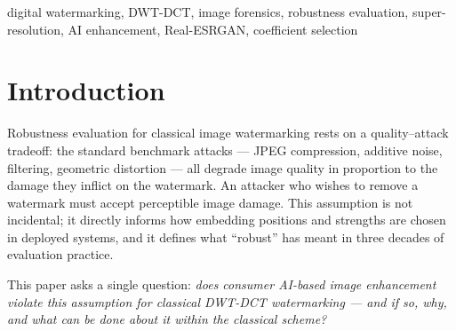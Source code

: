 \documentclass[conference]{IEEEtran}
\begin{document}
\begin{abstract}
removing 30--53\% of the embedded coefficient differential and moving
each block toward its natural coefficient ordering --- behavior
consistent with an \emph{endogenous restoration} process rather than
exogenous noise --- and 77--91\% of bit flips occur in blocks whose
natural ordering opposes the embedded bit. PSNR-oriented
super-resolution models show the same perturbation direction at
magnitudes an order of magnitude below the enforced decision margin,
consistent with why they leave the watermark intact.
The ESRGAN/JPEG anti-complementarity pattern is stable across embedding
strengths $\alpha \in \{0.05, 0.10, 0.20, 0.30\}$ (Spearman $\rho$
range $\leq 0.010$; Jaccard of top-10 damaged positions $= 1.0$).
These findings establish that attack-aware coefficient selection is
necessary but cannot simultaneously optimize against both
AI-enhancement and JPEG attacks within this scheme.
\end{abstract}

\begin{IEEEkeywords}
digital watermarking, DWT-DCT, image forensics, robustness evaluation,
super-resolution, AI enhancement, Real-ESRGAN, coefficient selection
\end{IEEEkeywords}

\section{Introduction}
\label{sec:intro}

Robustness evaluation for classical image watermarking rests on a
quality--attack tradeoff: the standard benchmark attacks --- JPEG
compression, additive noise, filtering, geometric distortion
\cite{petitcolas1998,cox2007} --- all degrade image quality in
proportion to the damage they inflict on the watermark. An attacker
who wishes to remove a watermark must accept perceptible image damage.
This assumption is not incidental; it directly informs how embedding
positions and strengths are chosen in deployed systems, and it defines
what ``robust'' has meant in three decades of evaluation practice.

This paper asks a single question: \emph{does consumer AI-based image
enhancement violate this assumption for classical DWT-DCT watermarking
--- and if so, why, and what can be done about it within the classical
scheme?}
\end{document}
